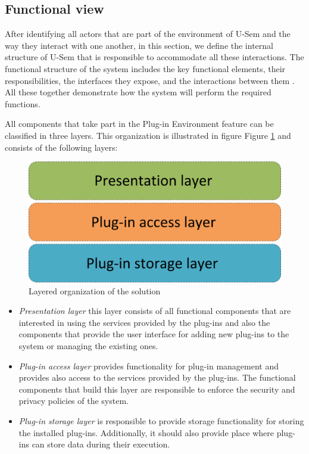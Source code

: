 \subsection{Functional view}

After identifying all actors that are part of the environment of U-Sem and the way they interact with one another, in this section, we define the internal structure of U-Sem that is responsible to accommodate all these interactions. The functional structure of the system includes the key functional elements, their responsibilities, the interfaces they expose, and the interactions between them \cite{rozanski2011software}. All these together demonstrate how the system will perform the required functions.

All components that take part in the Plug-in Environment feature can be classified in three layers. This organization is illustrated in figure Figure \ref{fig_layer} and consists of the following layers:

\begin{figure}[h!]
  \centering
  	\includegraphics[scale=0.6]{plug-in/layers/layers.png}
  \caption{Layered organization of the solution}
  \label{fig_layer}
\end{figure}

\begin{itemize}
	\item \textit{Presentation layer} this layer consists of all functional components that are interested in using the services provided by the plug-ins and also the components that provide the user interface for adding new plug-ins to the system or managing the existing ones. 
	\item \textit{Plug-in access layer} provides functionality for plug-in management and provides also access to the services provided by the plug-ins. The functional components that build this layer are responsible to enforce the security and privacy policies of the system.
	\item \textit{Plug-in storage layer} is responsible to provide storage functionality for storing the installed plug-ins. Additionally, it should also provide place where plug-ins can store data during their execution.
	\end{itemize}

